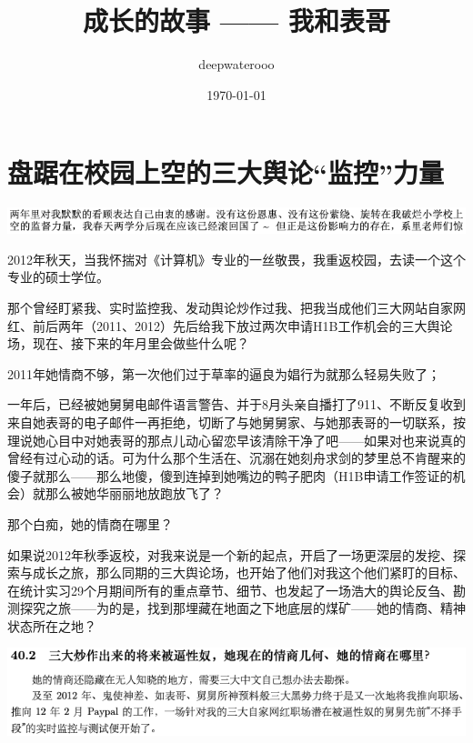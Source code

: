 \documentclass[9pt, b5paper]{article}
\author{deepwaterooo}
\date{\today}
\title{成长的故事 —— 我和表哥}
\begin{document}
\maketitle
\tableofcontents


\section{盘踞在校园上空的三大舆论“监控”力量}
\label{sec:org189f895}

\begin{center}
\includegraphics[width=.9\linewidth]{./pic/backups_plans_20210429_142459.png}
\end{center}

2012年秋天，当我怀揣对《计算机》专业的一丝敬畏，我重返校园，去读一个这个专业的硕士学位。

那个曾经盯紧我、实时监控我、发动舆论炒作过我、把我当成他们三大网站自家网红、前后两年（2011、2012）先后给我下放过两次申请H1B工作机会的三大舆论场，现在、接下来的年月里会做些什么呢？

2011年她情商不够，第一次他们过于草率的逼良为娼行为就那么轻易失败了；

一年后，已经被她舅舅电邮件语言警告、并于8月头亲自播打了911、不断反复收到来自她表哥的电子邮件一再拒绝，切断了与她舅舅家、与她那表哥的一切联系，按理说她心目中对她表哥的那点儿动心留恋早该清除干净了吧——如果对也来说真的曾经有过心动的话。可为什么那个生活在、沉溺在她刻舟求剑的梦里总不肯醒来的傻子就那么——那么地傻，傻到连掉到她嘴边的鸭子肥肉（H1B申请工作签证的机会）就那么被她华丽丽地放跑放飞了？

那个白痴，她的情商在哪里？

如果说2012年秋季返校，对我来说是一个新的起点，开启了一场更深层的发挖、探索与成长之旅，那么同期的三大舆论场，也开始了他们对我这个他们紧盯的目标、在统计实习29个月期间所有的重点章节、细节、也发起了一场浩大的舆论反刍、勘测探究之旅——为的是，找到那埋藏在地面之下地底层的煤矿——她的情商、精神状态所在之地？

\begin{center}
\includegraphics[width=.9\linewidth]{./pic/backups_plans_20210424_101221.png}
\end{center}
\end{document}

